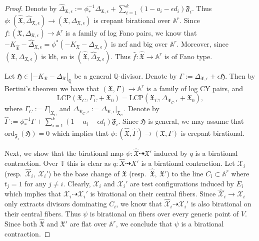 \documentclass[reqno, 12pt]{amsart}
\theoremstyle{definition}
\newcommand{\bA}{\mathbb{A}}
\newcommand{\bQ}{\mathbb{Q}}
\newcommand{\bT}{\mathbb{T}}
\newcommand{\cX}{\mathcal{X}}
\newcommand{\hX}{\widehat{X}}
\newcommand{\ord}{\mathrm{ord}}
\newcommand{\fX}{\mathfrak{X}}
\newcommand{\fD}{\mathfrak{D}}
\newcommand{\fE}{\mathfrak{E}}
\newcommand{\fH}{\mathfrak{H}}
\newcommand{\fF}{\mathfrak{F}}
\newcommand{\hf}{\hat{f}}
\newcommand{\hcX}{\widehat{\mathcal{X}}}
\newcommand{\hfX}{\widehat{\mathfrak{X}}}
\newcommand{\hGamma}{\widehat{\Gamma}}
\newcommand{\Src}{\mathrm{Src}}
\newcommand{\cbir}{\overset{\mathrm{cbir}}{\sim}}
\newcommand{\LCP}{\mathrm{LCP}}
\newcommand{\hDelta}{\widehat{\Delta}}
\numberwithin{equation}{section}
\begin{document}
\begin{proof}
Denote by $\hDelta_{\fX,\epsilon}:= \phi_*^{-1}\Delta_{\fX,\epsilon} + \sum_{i=1}^k (1-a_i-\epsilon d_i) \fF_i$. Thus $\phi: (\hfX, \hDelta_{\fX,\epsilon})\to (\fX, \Delta_{\fX,\epsilon})$ is crepant birational over $\bA^r$.
Since $f:(\fX, \Delta_{\fX,\epsilon})\to \bA^r$ is a family of log  Fano pairs, we know that $-K_{\hfX}- \hDelta_{\fX,\epsilon} = \phi^*(-K_{\fX}- \Delta_{\fX,\epsilon})$ is nef and big over $\bA^r$. Moreover, since $(\fX, \Delta_{\fX,\epsilon})$ is klt, so is $(\hfX, \hDelta_{\fX,\epsilon})$. Thus $\hf: \hfX\to \bA^r$ is of Fano type.

Let $\fH\in |-K_{\fX}-\Delta_{\fX}|_{\bQ}$ be a general  $\bQ$-divisor. Denote by $\Gamma:= \Delta_{\fX,\epsilon}+\epsilon \fH$. Then by Bertini's theorem we have that $(\fX, \Gamma)\to \bA^r$ is a family of log CY pairs, and 
\[
\LCP(\fX_C, \Gamma_C + \fX_0)=\LCP(\fX_C,\Delta_{\fX_C,\epsilon} + \fX_0),
\]
where $\Gamma_C:=\Gamma|_{\fX_C}$ and $\Delta_{\fX_C,\epsilon}:=\Delta_{\fX,\epsilon}|_{\fX_C}$.
Denote by $\hGamma:= \phi_*^{-1}\Gamma + \sum_{i=1}^k (1-a_i - \epsilon d_i) \fF_i$. 
Since $\fH$ is general, we may assume that $\ord_{\fF_i}(\fH)=0$ which implies that
 $\phi: (\hfX,  \hGamma)\to (\fX, \Gamma)$ is crepant birational. 



Next, we show that the birational map $\psi:\hfX \dashrightarrow \fX'$ induced by $q$ is a birational contraction. Over $\bT$ this is clear as $q: \hX \dashrightarrow X'$ is a birational contraction. Let $\cX_i$ (resp.\ $\hcX_i, ~\cX_i'$) be the base change of $\fX$ (resp.\ $\hfX,~ \fX'$) to the line $C_i\subset \bA^r$  where $t_j=1$ for any $j\neq i$. Clearly, $\cX_i$ and $\cX_i'$ are test configurations induced by $E_i$ which implies that $\cX_i \dashrightarrow \cX_i'$ is birational on their central fibers. Since $\hcX_i \to \cX_i$ only extracts divisors dominating $C_i$, we know that $\hcX_i\dashrightarrow \cX_i'$ is also birational on their central fibers. Thus $\psi$ is birational on  fibers over every generic point of $V$. Since both $\hfX$ and $\fX'$ are flat over $\bA^r$, we conclude that $\psi$ is a birational contraction.


\end{proof}
\end{document}
